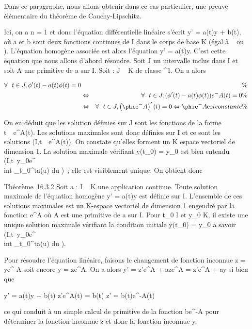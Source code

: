 \documentclass[]{article}
\begin{document}
Dans ce paragraphe, nous allons obtenir dans ce cas particulier, une
preuve élémentaire du théorème de Cauchy-Lipschitz.

Ici, on a n = 1 et donc l'équation différentielle linéaire s'écrit y' =
a(t)y + b(t), où a et b sont deux fonctions continues de I dans le corps
de base K (égal à ~ ou ). L'équation homogène associée est alors
l'équation y' = a(t)y. C'est cette équation que nous allons d'abord
résoudre. Soit J un intervalle inclus dans I et soit A une primitive de
a sur I. Soit \phi : J \rightarrow~ K de classe ^1. On a alors

\begin{align*} \forall~~t \in J,
\phi'(t) - a(t)\phi(t) = 0&& \%& \\ &
\Leftrightarrow & \forall~~t \in J, (\phi'(t)
- a(t)\phi(t))e^-A(t) = 0 \%& \\
& \Leftrightarrow & \forall~~t \in J,
\left (\phie^-A\right )'(t) = 0
\Leftrightarrow \phie^-A\text est
constante\%& \\
\end{align*}

On en déduit que les solution définies sur J sont les fonctions de la
forme t\mapsto~\lambda~e^A(t). Les solutions
maximales sont donc définies sur I et ce sont les solutions
(I,t\mapsto~\lambda~e^A(t)). On constate
qu'elles forment un K espace vectoriel de dimension 1. La solution
maximale vérifiant y(t_0) = y_0 est bien entendu
(I,t\mapsto~y_0e^\\int
 _t_0^ta(u) du )~; elle est visiblement
unique. On obtient donc

Théorème~16.3.2 Soit a : I \rightarrow~ K une application continue. Toute solution
maximale de l'équation homogène y' = a(t)y est définie sur I. L'ensemble
de ces solutions maximales est un K-espace vectoriel de dimension 1
engendré par la fonction e^A où A est une primitive de a sur
I. Pour t_0 \in I et y_0 \in K, il existe une unique
solution maximale vérifiant la condition initiale y(t_0) =
y_0 à savoir
(I,t\mapsto~y_0e^\\int
 _t_0^ta(u) du ).

Pour résoudre l'équation linéaire, faisons le changement de fonction
inconnue z = ye^-A soit encore y = ze^A. On a
alors y' = z'e^A + aze^A = z'e^A + ay
si bien que

y' = a(t)y + b(t) \Leftrightarrow z'e^A(t) =
b(t) \Leftrightarrow z' = b(t)e^-A(t)

ce qui conduit à un simple calcul de primitive de la fonction
be^-A pour déterminer la fonction inconnue z et donc la
fonction inconnue y.
\end{document}

